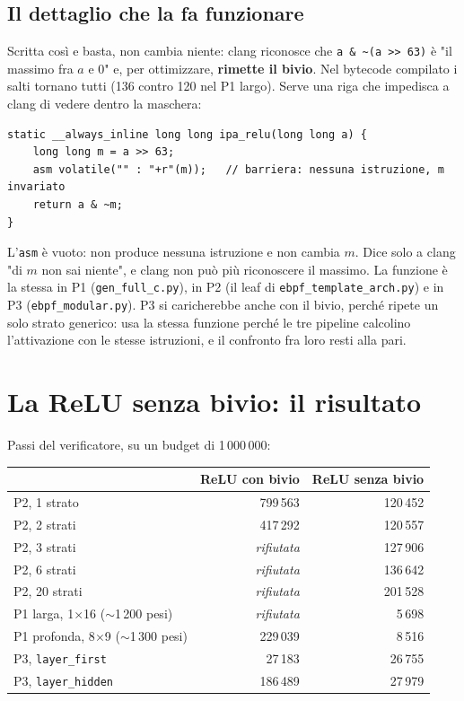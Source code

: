 \documentclass[11pt,a4paper,oneside]{report}
\begin{document}
\subsection*{Il dettaglio che la fa funzionare}

Scritta così e basta, non cambia niente: clang riconosce che
\texttt{a \& \textasciitilde(a >> 63)} è "il massimo fra $a$ e 0" e, per
ottimizzare, \textbf{rimette il bivio}. Nel bytecode compilato i salti tornano
tutti (136 contro 120 nel P1 largo). Serve una riga che impedisca a clang di
vedere dentro la maschera:

\begin{lstlisting}
static __always_inline long long ipa_relu(long long a) {
    long long m = a >> 63;
    asm volatile("" : "+r"(m));   // barriera: nessuna istruzione, m invariato
    return a & ~m;
}
\end{lstlisting}

L'\texttt{asm} è vuoto: non produce nessuna istruzione e non cambia $m$. Dice
solo a clang "di $m$ non sai niente", e clang non può più riconoscere il
massimo. La funzione è la stessa in P1 (\texttt{gen\_full\_c.py}), in P2 (il
leaf di \texttt{ebpf\_template\_arch.py}) e in P3 (\texttt{ebpf\_modular.py}). P3
si caricherebbe anche con il bivio, perché ripete un solo strato generico: usa
la stessa funzione perché le tre pipeline calcolino l'attivazione con le stesse
istruzioni, e il confronto fra loro resti alla pari.

\section{La ReLU senza bivio: il risultato}

Passi del verificatore, su un budget di 1\,000\,000:

\begin{center}
\small
\begin{tabular}{@{}lrr@{}}
\toprule
& \textbf{ReLU con bivio} & \textbf{ReLU senza bivio} \\
\midrule
P2, 1 strato & 799\,563 & 120\,452 \\
P2, 2 strati & 417\,292 & 120\,557 \\
P2, 3 strati & \emph{rifiutata} & 127\,906 \\
P2, 6 strati & \emph{rifiutata} & 136\,642 \\
P2, 20 strati & \emph{rifiutata} & 201\,528 \\
\midrule
P1 larga, 1$\times$16 ($\sim$1\,200 pesi) & \emph{rifiutata} & 5\,698 \\
P1 profonda, 8$\times$9 ($\sim$1\,300 pesi) & 229\,039 & 8\,516 \\
\midrule
P3, \texttt{layer\_first} & 27\,183 & 26\,755 \\
P3, \texttt{layer\_hidden} & 186\,489 & 27\,979 \\
\bottomrule
\end{tabular}
\end{center}
\end{document}
